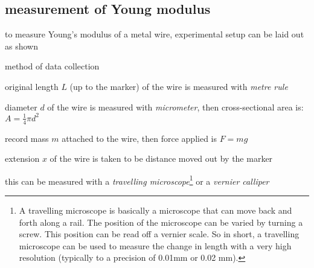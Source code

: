 \subsection{measurement of Young modulus}\label{ch-measure-E}

to measure Young's modulus of a metal wire, experimental setup can be laid out as shown


\begin{figure}[ht]
	\centering
\end{figure}

\cmt method of data collection

\titem original length $L$ (up to the marker) of the wire is measured with \emph{metre rule}

\titem diameter $d$ of the wire is measured with \emph{micrometer}, then cross-sectional area is: $A = \frac{1}{4}\pi d^2$

\titem record mass $m$ attached to the wire, then force applied is $F=mg$

\titem extension $x$ of the wire is taken to be distance moved out by the marker

\phantom{\titem}this can be measured with a \emph{travelling microscope}\footnote{A travelling microscope is basically a microscope that can move back and forth along a rail. The position of the microscope can be varied by turning a screw. This position can be read off a vernier scale. So in short, a travelling microscope can be used to measure the change in length with a very high resolution (typically to a precision of 0.01mm or 0.02 mm).} or a \emph{vernier calliper}

